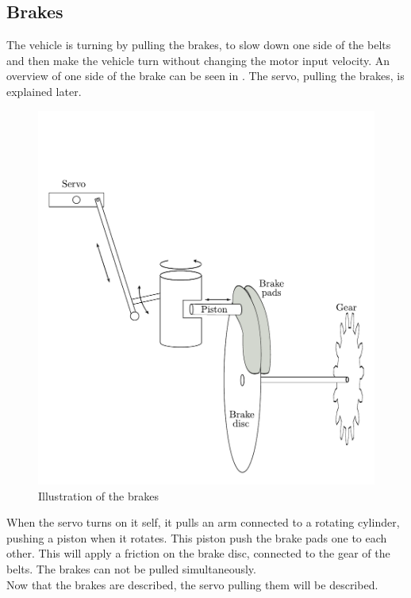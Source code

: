 \subsection{Brakes}

The vehicle is turning by pulling the brakes, to slow down one side of the belts and then make the vehicle turn without changing the motor input velocity. An overview of one side of the brake can be seen in . The servo, pulling the brakes, is explained later.

 \begin{figure}[H]
	\centering
	\includegraphics[scale=0.6]{figures/brakeDescription.pdf}
	\caption{Illustration of the brakes}
	\label{Brakes}
\end{figure}

When the servo turns on it self, it pulls an arm connected to a rotating cylinder, pushing a piston when it rotates. This piston push the brake pads one to each other. This will apply a friction on the brake disc, connected to the gear of the belts. The brakes can not be pulled simultaneously.\\

Now that the brakes are described, the servo pulling them will be described.
